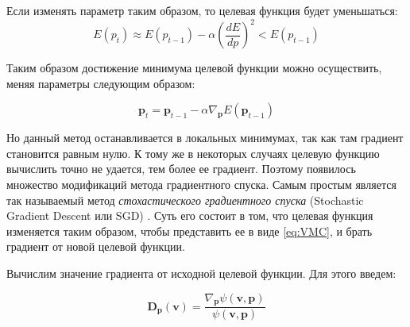 Если изменять параметр таким образом, то целевая функция будет уменьшаться:
\begin{equation*}
E(p_t)\approx E(p_{t-1}) - \alpha \left(\frac{dE}{dp}\right)^2 < E(p_{t-1})
\end{equation*}

Таким образом достижение минимума целевой функции можно осуществить, меняя параметры следующим образом:

\begin{equation}
\mathbf{p}_t =\mathbf{p}_{t-1} - \alpha\nabla_{\mathbf{p}} E(\mathbf{p}_{t-1})
\end{equation}

Но данный метод останавливается в локальных минимумах, так как там градиент становится равным нулю.
К тому же в некоторых случаях целевую функцию вычислить точно не удается, тем более ее градиент. 
Поэтому появилось множество модификаций метода градиентного спуска. Самым простым является так называемый метод \textit{стохастического градиентного спуска} (Stochastic Gradient Descent или SGD) \cite{harju1997stochastic}. Суть его состоит в том, что целевая функция изменяется таким образом, чтобы представить ее в виде \eqref{eq:VMC}, и брать градиент  от новой целевой функции.

Вычислим значение градиента от исходной целевой функции. Для этого введем:

\begin{equation*}
\mathbf{D}_{\mathbf{p}}(\mathbf{v})=\frac{\nabla_{\mathbf{p}}\psi(\mathbf{v},\mathbf{p})}{\psi(\mathbf{v},\mathbf{p})}
\end{equation*}

